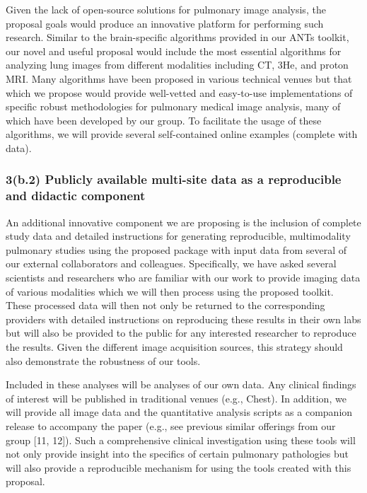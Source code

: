 \documentclass[11pt,]{article}
\begin{document}
Given the lack of open-source solutions for pulmonary image analysis,
the proposal goals would produce an innovative platform for performing
such research. Similar to the brain-specific algorithms provided in our
ANTs toolkit, our novel and useful proposal would include the most
essential algorithms for analyzing lung images from different modalities
including CT, 3He, and proton MRI. Many algorithms have been proposed in
various technical venues but that which we propose would provide
well-vetted and easy-to-use implementations of specific robust
methodologies for pulmonary medical image analysis, many of which have
been developed by our group. To facilitate the usage of these
algorithms, we will provide several self-contained online examples
(complete with data).

\subsubsection{3(b.2) Publicly available multi-site data as a
reproducible and didactic
component}\label{b.2-publicly-available-multi-site-data-as-a-reproducible-and-didactic-component}

An additional innovative component we are proposing is the inclusion of
complete study data and detailed instructions for generating
reproducible, multimodality pulmonary studies using the proposed package
with input data from several of our external collaborators and
colleagues. Specifically, we have asked several scientists and
researchers who are familiar with our work to provide imaging data of
various modalities which we will then process using the proposed
toolkit. These processed data will then not only be returned to the
corresponding providers with detailed instructions on reproducing these
results in their own labs but will also be provided to the public for
any interested researcher to reproduce the results. Given the different
image acquisition sources, this strategy should also demonstrate the
robustness of our tools.

Included in these analyses will be analyses of our own data. Any
clinical findings of interest will be published in traditional venues
(e.g., Chest). In addition, we will provide all image data and the
quantitative analysis scripts as a companion release to accompany the
paper (e.g., see previous similar offerings from our group {[}11,
12{]}). Such a comprehensive clinical investigation using these tools
will not only provide insight into the specifics of certain pulmonary
pathologies but will also provide a reproducible mechanism for using the
tools created with this proposal.
\end{document}
